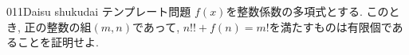 \begin{prob}{011}{}{Daisu shukudai テンプレート問題}
    $f(x)$を整数係数の多項式とする. このとき, 正の整数の組$(m,n)$であって, $n!! + f(n) = m!$を満たすものは有限個であることを証明せよ. 
\end{prob}
